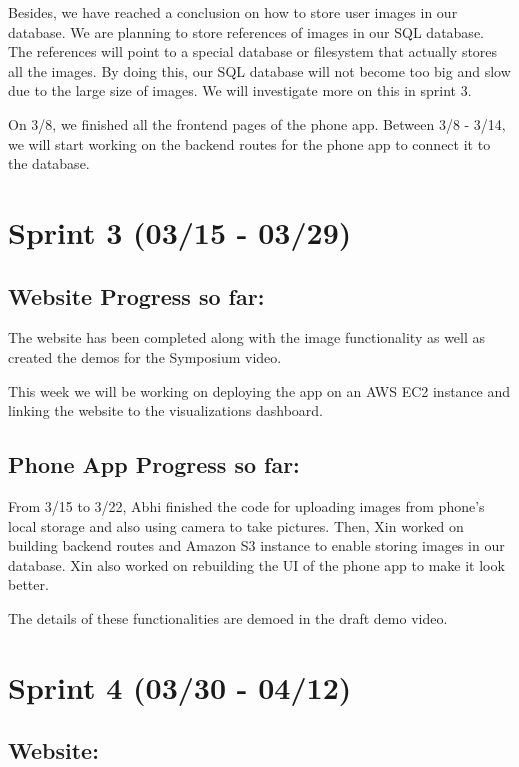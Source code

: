 \documentclass[]{book}
\begin{document}
Besides, we have reached a conclusion on how to store user images in our
database. We are planning to store references of images in our SQL
database. The references will point to a special database or filesystem
that actually stores all the images. By doing this, our SQL database
will not become too big and slow due to the large size of images. We
will investigate more on this in sprint 3.

On 3/8, we finished all the frontend pages of the phone app. Between 3/8
- 3/14, we will start working on the backend routes for the phone app to
connect it to the database.

\section{Sprint 3 (03/15 - 03/29)}\label{sprint-3-0315---0329}

\subsection{Website Progress so far:}\label{website-progress-so-far}

The website has been completed along with the image functionality as
well as created the demos for the Symposium video.

This week we will be working on deploying the app on an AWS EC2 instance
and linking the website to the visualizations dashboard.

\subsection{Phone App Progress so
far:}\label{phone-app-progress-so-far-1}

From 3/15 to 3/22, Abhi finished the code for uploading images from
phone's local storage and also using camera to take pictures. Then, Xin
worked on building backend routes and Amazon S3 instance to enable
storing images in our database. Xin also worked on rebuilding the UI of
the phone app to make it look better.

The details of these functionalities are demoed in the draft demo video.

\section{Sprint 4 (03/30 - 04/12)}\label{sprint-4-0330---0412}

\subsection{Website:}\label{website-1}
\end{document}
